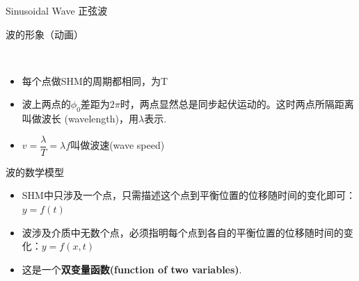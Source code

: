 \documentclass{beamer}
\begin{document}
\begin{frame}{Sinusoidal Wave 正弦波}
	\begin{block}{波的形象（动画）}
		\begin{center}
		\href{run:./LectureNotePics/Transverse.gif}{}\\
		\end{center}
	\end{block}
	
	\begin{itemize}
		\item 每个点做SHM的周期都相同，为T
		\item 波上两点的$\phi_0$差距为$2\pi$时，两点显然总是同步起伏运动的。这时两点所隔距离叫做波长 (wavelength)，用$\lambda$表示.
		\item $v = \dfrac{\lambda}{T} = \lambda f$叫做波速(wave speed)
	\end{itemize}
\end{frame}

\begin{frame}{波的数学模型}
	\begin{itemize}
		\item SHM中只涉及一个点，只需描述这个点到平衡位置的位移随时间的变化即可：$y=f\left(t\right)$
		\item 波涉及介质中无数个点，必须指明每个点到各自的平衡位置的位移随时间的变化：$y=f\left(x, t\right)$
		\item 这是一个\textbf{双变量函数(function of two variables)}.
	\end{itemize}
\end{frame}
\end{document}

